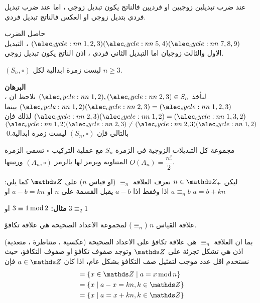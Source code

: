 \begin{theorem}
	عند ضرب تبديلين زوجيين او فرديين فالناتج يكون تبديل زوجي ، اما عند ضرب تبديل فردي بتديل زوجي او العكس فالناتج تبديل فردي.
\end{theorem}

\begin{example}
	حاصل الضرب $\cycle{1,2,3} \cycle{5,4}\cycle{7,8,9}$ ، التبديل الاول والثالث زوجيان اما التبديل الثاني فردي ، اذن الناتج يكون تبديل زوجي.
\end{example}

\begin{lemma}
	$(S_n, \circ)$ ليست زمرة ابدالية لكل $n\geq 3$.
\end{lemma}
\noindent
\textbf{البرهان}\\
\noindent
لنأخذ $\cycle{1,2}, \cycle{2,3} \in S_n$ نلاحظ ان ، 
$\cycle{1,2}\cycle{2,3} = \cycle{1,2,3}$ بينما
$\cycle{2,3}\cycle{1,2} = \cycle{1,3,2}$
لذلك فإن 
$\cycle{1,2}\cycle{2,3} \neq\cycle{2,3}\cycle{1,2}$
بالتالي فإن $(S_n , \circ)$ ليست زمرة ابدالية.\qed

\begin{definition}
	مجموعة كل التبديلات الزوجية في الزمرة $S_n$ مع عملية التركيب $\circ$ تسمى الزمرة المتناوبة ويرمز لها بالرمز $(A_n, \circ)$ ورتبتها $O(A_n) = \dfrac{n!}{2}$.
\end{definition}


\begin{definition}
	ليكن $n\in \Z_+$ نعرف العلاقة $\equiv_n$ (او قياس $n$) على $\Z$ كما يلي: $a\equiv_n b$ اذا وفقط اذا $a-b$ يقبل القسمة على $n$ او $a-b = kn$ او $a=b+kn$
\end{definition}
\noindent\textbf{مثال:} $3\equiv1\operatorname{mod} 2$ او $3\equiv_2 1$

\begin{theorem}
	علاقة القياس $n$ ($\equiv_n$) لمجموعة الاعداد الصحيحة هي علاقة تكافؤ.
\end{theorem}

\begin{note}
	بما ان العلاقة $\equiv_n$ هي علاقة تكافؤ على الاعداد الصحيحة (عكسية ، متناظرة ، متعدية) اذن هي تشكل تجزئة على $\Z$ وتوجد صفوف تكافؤ او صفوف التكافؤ، حيث نستخدم اقل عدد موجب لتمثيل صف التكافؤ بشكل عام، اذا كان $a\in \Z$ فإن
	\begin{align*}
			[a] &= \{x\in \Z \mid a=x\Mod n\}\\
			&= \{x\mid a-x = kn, k\in \Z\}\\
			&= \{x\mid a = x + kn, k\in \Z \}
	\end{align*}
\end{note}

